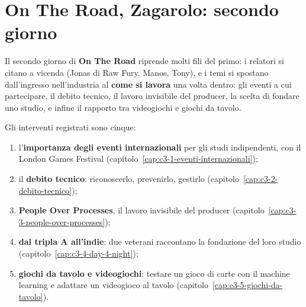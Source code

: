 
\chapter*{On The Road, Zagarolo: secondo giorno}
{}

Il secondo giorno di \textbf{On The Road} riprende molti fili del primo: i
relatori si citano a vicenda (Jonas di Raw Fury, Manos, Tony), e i temi si
spostano dall'ingresso nell'industria al \textbf{come si lavora} una volta dentro:
gli eventi a cui partecipare, il debito tecnico, il lavoro invisibile del producer,
la scelta di fondare uno studio, e infine il rapporto tra videogiochi e giochi da
tavolo.

Gli interventi registrati sono cinque:
\begin{enumerate}
  \item l'\textbf{importanza degli eventi internazionali} per gli studi
        indipendenti, con il London Games Festival
        (capitolo~\ref{cap:c3-1-eventi-internazionali});
  \item il \textbf{debito tecnico}: riconoscerlo, prevenirlo, gestirlo
        (capitolo~\ref{cap:c3-2-debito-tecnico});
  \item \textbf{People Over Processes}, il lavoro invisibile del producer
        (capitolo~\ref{cap:c3-3-people-over-processes});
  \item \textbf{dal tripla A all'indie}: due veterani raccontano la fondazione del
        loro studio (capitolo~\ref{cap:c3-4-day-4-night});
  \item \textbf{giochi da tavolo e videogiochi}: testare un gioco di carte con il
        machine learning e adattare un videogioco al tavolo
        (capitolo~\ref{cap:c3-5-giochi-da-tavolo}).
\end{enumerate}
